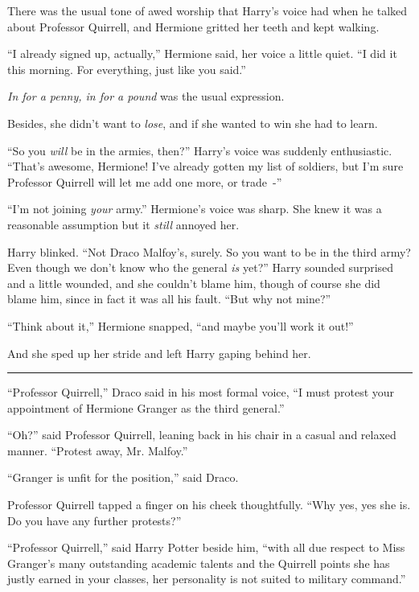 There was the usual tone of awed worship that Harry's voice had when he talked about Professor Quirrell, and Hermione gritted her teeth and kept walking.

``I already signed up, actually,'' Hermione said, her voice a little quiet. ``I did it this morning. For everything, just like you said.''

\emph{In for a penny, in for a pound} was the usual expression.

Besides, she didn't want to \emph{lose}, and if she wanted to win she had to learn.

``So you \emph{will} be in the armies, then?'' Harry's voice was suddenly enthusiastic. ``That's awesome, Hermione! I've already gotten my list of soldiers, but I'm sure Professor Quirrell will let me add one more, or trade~-''

``I'm not joining \emph{your} army.'' Hermione's voice was sharp. She knew it was a reasonable assumption but it \emph{still} annoyed her.

Harry blinked. ``Not Draco Malfoy's, surely. So you want to be in the third army? Even though we don't know who the general \emph{is} yet?'' Harry sounded surprised and a little wounded, and she couldn't blame him, though of course she did blame him, since in fact it was all his fault. ``But why not mine?''

``Think about it,'' Hermione snapped, ``and maybe you'll work it out!''

And she sped up her stride and left Harry gaping behind her.

\begin{center}\rule{3in}{0.4pt}\end{center}

``Professor Quirrell,'' Draco said in his most formal voice, ``I must protest your appointment of Hermione Granger as the third general.''

``Oh?'' said Professor Quirrell, leaning back in his chair in a casual and relaxed manner. ``Protest away, Mr. Malfoy.''

``Granger is unfit for the position,'' said Draco.

Professor Quirrell tapped a finger on his cheek thoughtfully. ``Why yes, yes she is. Do you have any further protests?''

``Professor Quirrell,'' said Harry Potter beside him, ``with all due respect to Miss Granger's many outstanding academic talents and the Quirrell points she has justly earned in your classes, her personality is not suited to military command.''

